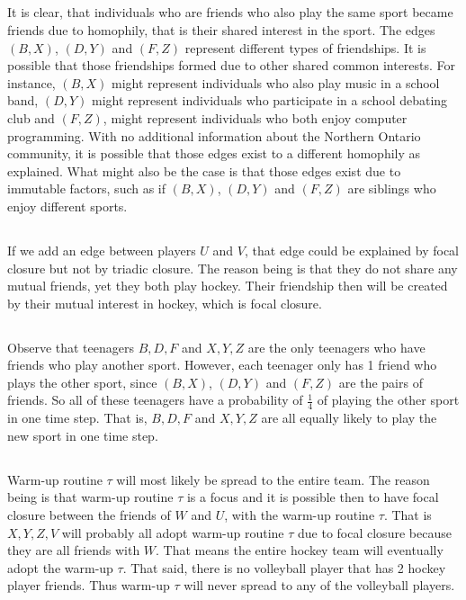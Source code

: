 \documentclass[12pt]{article}
\begin{document}
\subsection{}
It is clear, that individuals who are friends who also play the same sport became friends due to homophily, that is their shared interest in the sport. The edges $(B,X)$, $(D,Y)$ and $(F,Z)$ represent different types of friendships. It is possible that those friendships formed due to other shared common interests. For instance, $(B,X)$ might represent individuals who also play music in a school band, $(D,Y)$ might represent individuals who participate in a school debating club and $(F,Z)$, might represent individuals who both enjoy computer programming. With no additional information about the Northern Ontario community, it is possible that those edges exist to a different homophily as explained. What might also be the case is that those edges exist due to immutable factors, such as if $(B,X)$, $(D,Y)$ and $(F,Z)$ are siblings who enjoy different sports. 
\subsection{}
If we add an edge between players $U$ and $V$, that edge could be explained by focal closure but not by triadic closure. The reason being is that they do not share any mutual friends, yet they both play hockey. Their friendship then will be created by their mutual interest in hockey, which is focal closure. 
\subsection{}
Observe that teenagers $B,D,F$ and $X,Y,Z$ are the only teenagers who have friends who play another sport. However, each teenager only has 1 friend who plays the other sport, since $(B,X)$, $(D,Y)$ and $(F,Z)$ are the pairs of friends. So all of these teenagers have a probability of $\frac{1}{4}$ of playing the other sport in one time step. That is, $B,D,F$ and $X,Y,Z$ are all equally likely to play the new sport in one time step.
\subsection{}
Warm-up routine $\tau$ will most likely be spread to the entire team. The reason being is that warm-up routine $\tau$ is a focus and it is possible then to have focal closure between the friends of $W$ and $U$, with the warm-up routine $\tau$. That is $X, Y, Z, V$ will probably all adopt warm-up routine $\tau$ due to focal closure because they are all friends with $W$. That means the entire hockey team will eventually adopt the warm-up $\tau$. That said, there is no volleyball player that has 2 hockey player friends. Thus warm-up $\tau$ will never spread to any of the volleyball players. 
\end{document}

